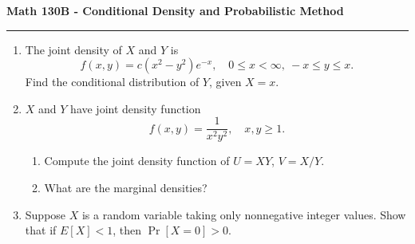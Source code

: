 \documentclass[11pt,letterpaper]{report}
\begin{document}
\begin{center}
{\bf \Large Math 130B - Conditional Density and Probabilistic Method}
\vspace{0.2cm}
\hrule
\end{center}

\begin{enumerate}
	\item The joint density of $X$ and $Y$ is 
	\[
	f(x,y) = c(x^2-y^2)e^{-x},\quad 0\leq x<\infty,\ -x\leq y\leq x.
	\]
	Find the conditional distribution of $Y$, given $X = x$.

	\vfill

	\item $X$ and $Y$ have joint density function
	\[
	f(x,y) = \frac{1}{x^2y^2},\quad x,y\geq 1.
	\]
	\begin{enumerate}
		\item Compute the joint density function of $U = XY$, $V = X/Y$.
		\item What are the marginal densities?
	\end{enumerate}

	\vfill

	\item Suppose $X$ is a random variable taking only nonnegative integer values. Show that if $E[X]<1$, then $\Pr[X=0] > 0$.
	\vfill

\end{enumerate}
\end{document}
